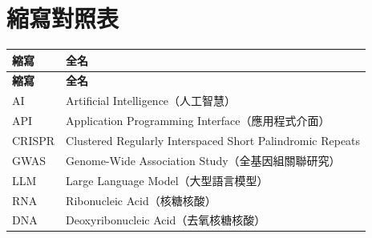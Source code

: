 \documentclass[12pt,a4paper]{article}
\begin{document}
\section{縮寫對照表}

\begin{longtable}{p{4cm}p{10cm}}
\toprule
\textbf{縮寫} & \textbf{全名} \\
\midrule
\endfirsthead

\toprule
\textbf{縮寫} & \textbf{全名} \\
\midrule
\endhead

\bottomrule
\endfoot

AI & Artificial Intelligence（人工智慧） \\
API & Application Programming Interface（應用程式介面） \\
CRISPR & Clustered Regularly Interspaced Short Palindromic Repeats \\
GWAS & Genome-Wide Association Study（全基因組關聯研究） \\
LLM & Large Language Model（大型語言模型） \\
RNA & Ribonucleic Acid（核糖核酸） \\
DNA & Deoxyribonucleic Acid（去氧核糖核酸） \\
\bottomrule
\end{longtable}
\end{document}
